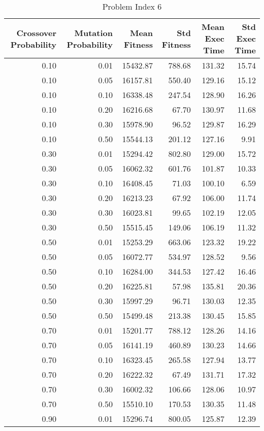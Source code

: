 \begin{table}
\caption{Problem Index 6}
\label{tab:problem_6}
\begin{tabular}{rrrrrr}
\toprule
Crossover Probability & Mutation Probability & Mean Fitness & Std Fitness & Mean Exec Time & Std Exec Time \\
\midrule
0.10 & 0.01 & 15432.87 & 788.68 & 131.32 & 15.74 \\
0.10 & 0.05 & 16157.81 & 550.40 & 129.16 & 15.12 \\
0.10 & 0.10 & 16338.48 & 247.54 & 128.90 & 16.26 \\
0.10 & 0.20 & 16216.68 & 67.70 & 130.97 & 11.68 \\
0.10 & 0.30 & 15978.90 & 96.52 & 129.87 & 16.29 \\
0.10 & 0.50 & 15544.13 & 201.12 & 127.16 & 9.91 \\
0.30 & 0.01 & 15294.42 & 802.80 & 129.00 & 15.72 \\
0.30 & 0.05 & 16062.32 & 601.76 & 101.87 & 10.33 \\
0.30 & 0.10 & 16408.45 & 71.03 & 100.10 & 6.59 \\
0.30 & 0.20 & 16213.23 & 67.92 & 106.00 & 11.74 \\
0.30 & 0.30 & 16023.81 & 99.65 & 102.19 & 12.05 \\
0.30 & 0.50 & 15515.45 & 149.06 & 106.19 & 11.32 \\
0.50 & 0.01 & 15253.29 & 663.06 & 123.32 & 19.22 \\
0.50 & 0.05 & 16072.77 & 534.97 & 128.52 & 9.56 \\
0.50 & 0.10 & 16284.00 & 344.53 & 127.42 & 16.46 \\
0.50 & 0.20 & 16225.81 & 57.98 & 135.81 & 20.36 \\
0.50 & 0.30 & 15997.29 & 96.71 & 130.03 & 12.35 \\
0.50 & 0.50 & 15499.48 & 213.38 & 130.45 & 15.85 \\
0.70 & 0.01 & 15201.77 & 788.12 & 128.26 & 14.16 \\
0.70 & 0.05 & 16141.19 & 460.89 & 130.23 & 14.66 \\
0.70 & 0.10 & 16323.45 & 265.58 & 127.94 & 13.77 \\
0.70 & 0.20 & 16222.32 & 67.49 & 131.71 & 17.32 \\
0.70 & 0.30 & 16002.32 & 106.66 & 128.06 & 10.97 \\
0.70 & 0.50 & 15510.10 & 170.53 & 130.35 & 11.48 \\
0.90 & 0.01 & 15296.74 & 800.05 & 125.87 & 12.39 \\

\end{tabular}
\end{table}
